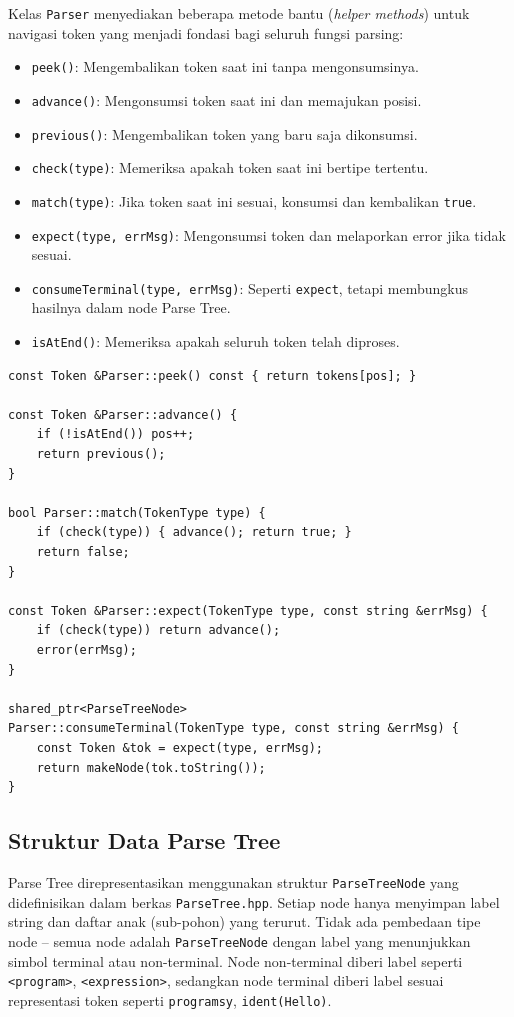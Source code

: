 \documentclass[12pt,a4paper]{article}
\begin{document}
Kelas \texttt{Parser} menyediakan beberapa metode bantu (\textit{helper methods}) untuk navigasi token yang menjadi fondasi bagi seluruh fungsi parsing:

\begin{itemize}
    \item \texttt{peek()}: Mengembalikan token saat ini tanpa mengonsumsinya.
    \item \texttt{advance()}: Mengonsumsi token saat ini dan memajukan posisi.
    \item \texttt{previous()}: Mengembalikan token yang baru saja dikonsumsi.
    \item \texttt{check(type)}: Memeriksa apakah token saat ini bertipe tertentu.
    \item \texttt{match(type)}: Jika token saat ini sesuai, konsumsi dan kembalikan \texttt{true}.
    \item \texttt{expect(type, errMsg)}: Mengonsumsi token dan melaporkan error jika tidak sesuai.
    \item \texttt{consumeTerminal(type, errMsg)}: Seperti \texttt{expect}, tetapi membungkus hasilnya dalam node Parse Tree.
    \item \texttt{isAtEnd()}: Memeriksa apakah seluruh token telah diproses.
\end{itemize}

\begin{lstlisting}[style=cpp, caption={Implementasi metode bantu parser}]
const Token &Parser::peek() const { return tokens[pos]; }

const Token &Parser::advance() {
    if (!isAtEnd()) pos++;
    return previous();
}

bool Parser::match(TokenType type) {
    if (check(type)) { advance(); return true; }
    return false;
}

const Token &Parser::expect(TokenType type, const string &errMsg) {
    if (check(type)) return advance();
    error(errMsg);
}

shared_ptr<ParseTreeNode>
Parser::consumeTerminal(TokenType type, const string &errMsg) {
    const Token &tok = expect(type, errMsg);
    return makeNode(tok.toString());
}
\end{lstlisting}

\subsection{Struktur Data Parse Tree}

Parse Tree direpresentasikan menggunakan struktur \texttt{ParseTreeNode} yang didefinisikan dalam berkas \texttt{ParseTree.hpp}. Setiap node hanya menyimpan label string dan daftar anak (sub-pohon) yang terurut. Tidak ada pembedaan tipe node -- semua node adalah \texttt{ParseTreeNode} dengan label yang menunjukkan simbol terminal atau non-terminal. Node non-terminal diberi label seperti \texttt{<program>}, \texttt{<expression>}, sedangkan node terminal diberi label sesuai representasi token seperti \texttt{programsy}, \texttt{ident(Hello)}.
\end{document}
